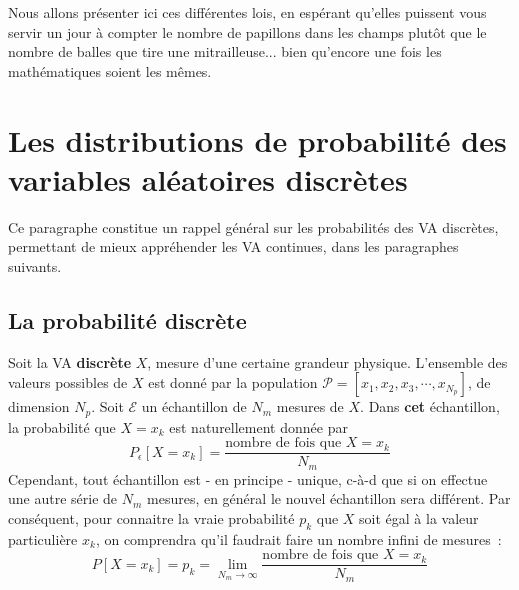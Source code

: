 Nous allons présenter ici ces différentes lois, en espérant qu'elles puissent vous servir un jour à compter le nombre de papillons dans les champs plutôt que le nombre de balles que tire  une mitrailleuse... bien qu'encore une fois les mathématiques soient les mêmes.

\section{Les distributions de probabilité des variables aléatoires discrètes}

Ce paragraphe constitue un rappel général sur les probabilités des VA discrètes, permettant de mieux appréhender les VA continues, dans les paragraphes suivants.

\subsection{La probabilité discrète}

Soit la VA \textbf{discrète} $X$, mesure d'une certaine grandeur physique. L'ensemble des valeurs possibles de $X$ est donné par la population $\mathcal{P}=[x_1,x_2,x_3,\cdots,x_{N_p}]$, de dimension $N_p$.
Soit $\mathcal{E}$ un échantillon de $N_m$ mesures de $X$. Dans \textbf{cet} échantillon, la probabilité que $X=x_k$ est naturellement donnée par
\begin{equation}
P_\epsilon[X=x_k]=
\frac{\text{nombre de fois que $X=x_k$}}
{N_m}
\end{equation}
Cependant, tout échantillon est - en principe - unique, c-à-d que si on effectue une autre série de $N_m$ mesures, en général le nouvel échantillon sera différent. Par conséquent, pour connaitre la vraie probabilité $p_k$ que $X$ soit égal à la valeur particulière $x_k$, on comprendra qu'il faudrait faire un nombre infini de mesures~:
\begin{equation}
P[X=x_k]=p_k=\lim_{N_m\rightarrow\infty}
\frac{\text{nombre de fois que $X=x_k$}}{N_m}
\end{equation}


